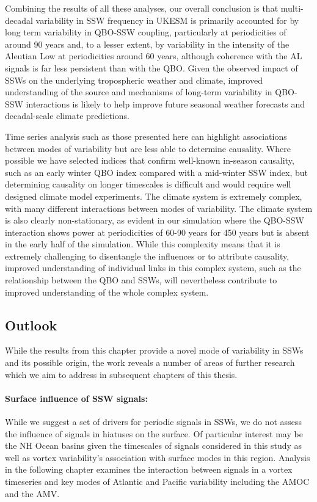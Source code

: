 Combining the results of all these analyses, our overall conclusion is that multi-decadal variability in SSW frequency in UKESM is primarily accounted for by long term variability in QBO-SSW coupling, particularly at periodicities of around 90 years and, to a lesser extent, by variability in the intensity of the Aleutian Low at periodicities around 60 years, although coherence with the AL signals is far less persistent than with the QBO. Given the observed impact of SSWs on the underlying tropospheric weather and climate, improved understanding of the source and mechanisms of long-term variability in QBO-SSW interactions is likely to help improve future seasonal weather forecasts and decadal-scale climate predictions.

Time series analysis such as those presented here can highlight associations between modes of variability but are less able to determine causality. Where possible we have selected indices that confirm well-known in-season causality, such as an early winter QBO index compared with a mid-winter SSW index, but determining causality on longer timescales is  difficult and would require well designed climate model experiments. The climate system is extremely complex, with many different interactions between modes of variability. The climate system is also clearly non-stationary, as evident in our simulation where the QBO-SSW interaction shows power at periodicities of 60-90 years for 450 years but is absent in the early half of the simulation. While this complexity means that it is extremely challenging to disentangle the influences or to attribute causality, improved understanding of individual links in this complex system, such as the relationship between the QBO and SSWs, will nevertheless contribute to improved understanding of the whole complex system.  


\subsection*{Outlook}
While the results from this chapter provide a novel mode of variability in SSWs and its possible origin, the work reveals a number of areas of further research which we aim to address in subsequent chapters of this thesis.

\paragraph{Surface influence of SSW signals:} While we suggest a set of drivers for periodic signals in SSWs, we do not assess the influence of signals in hiatuses on the surface. Of particular interest may be the NH Ocean basins given the timescales of signals considered in this study as well as vortex variability's association with surface modes in this region. Analysis in the following chapter examines the interaction between signals in a vortex timeseries and key modes of Atlantic and Pacific variability including the AMOC and the AMV.

